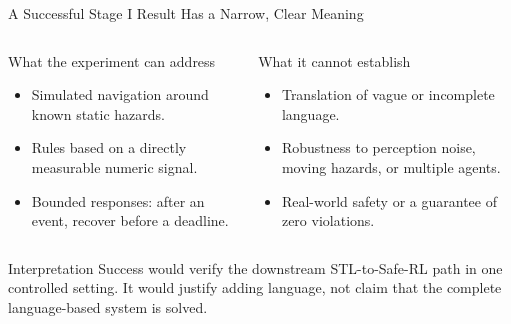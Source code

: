 \documentclass[aspectratio=169]{beamer}
\begin{document}
\begin{frame}{A Successful Stage I Result Has a Narrow, Clear Meaning}
\begin{columns}[T]
\begin{block}{What the experiment can address}
\footnotesize
\begin{itemize}
  \item Simulated navigation around known static hazards.
  \item Rules based on a directly measurable numeric signal.
  \item Bounded responses: after an event, recover before a deadline.
\end{itemize}
\end{block}

\begin{block}{What it cannot establish}
\footnotesize
\begin{itemize}
  \item Translation of vague or incomplete language.
  \item Robustness to perception noise, moving hazards, or multiple agents.
  \item Real-world safety or a guarantee of zero violations.
\end{itemize}
\end{block}
\end{columns}

\vspace{0.65em}
\begin{block}{Interpretation}
\large
Success would verify the downstream STL-to-Safe-RL path in one controlled setting. It would justify adding language, not claim that the complete language-based system is solved.
\end{block}
\end{frame}
\end{document}
